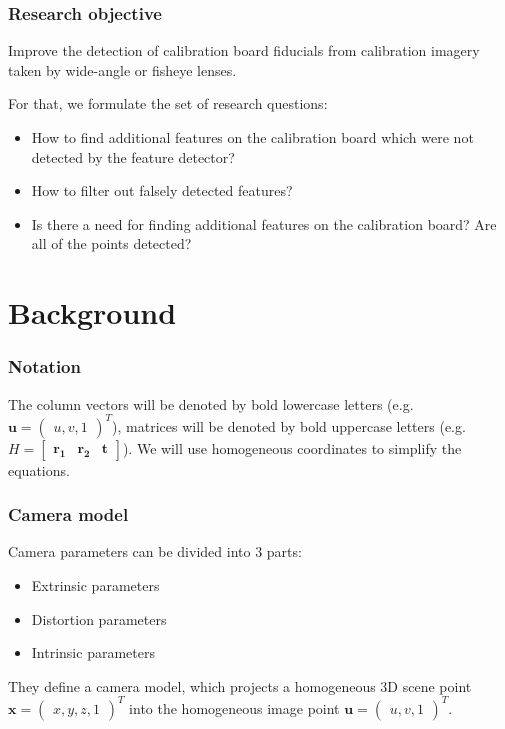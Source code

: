 \documentclass{beamer}
\begin{document}
\begin{frame}
	\frametitle{Research objective}

	Improve the detection of
	calibration board fiducials from calibration imagery taken by wide-angle or
	fisheye lenses.


	For that, we formulate the set of research questions:
	\begin{itemize}
		\item How to find additional features on the calibration board which were not
		      detected by the feature detector?
		\item How to filter out falsely detected features?
		\item Is there a need for finding additional features on the calibration
		      board? Are all of the points detected?
	\end{itemize}
\end{frame}

\section{Background}\label{sec:background}

\begin{frame}
	\frametitle{Notation}
	The column vectors will be denoted by bold lowercase letters (e.g.
	\(\mathbf{u} = \begin{pmatrix}
		u, v, 1
	\end{pmatrix}^{T}\)), matrices will be denoted by bold uppercase letters (e.g.
	\(H = \begin{bmatrix}
		\mathbf{r_1} & \mathbf{r_2} & \mathbf{t}
	\end{bmatrix}
	\)). We will use homogeneous coordinates to simplify the equations.
\end{frame}

\begin{frame}
	\frametitle{Camera model}
	Camera parameters can be divided into 3 parts:
	\begin{itemize}
		\item Extrinsic parameters
		\item Distortion parameters
		\item Intrinsic parameters
	\end{itemize}

	They define a camera model, which
	projects a homogeneous 3D scene point
	\(\mathbf{x} = \begin{pmatrix}
		x, y, z, 1
	\end{pmatrix}^{T}\) into the homogeneous image point
	\(\mathbf{u} = \begin{pmatrix}
		u, v, 1
	\end{pmatrix}^{T}\).
\end{frame}
\end{document}
